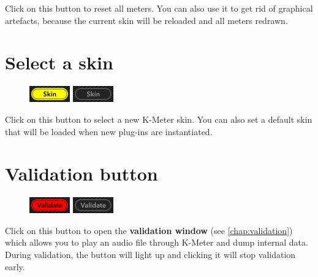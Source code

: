 Click on this button to reset all meters.  You can also use it to get
rid of graphical artefacts, because the current skin will be reloaded
and all meters redrawn.

\section{Select a skin}

\begin{figure}
\includegraphics[scale=\screenshotscale,clip]{include/images/button_skin_on.png}
\newline \vspace{-0.9\baselineskip}
\includegraphics[scale=\screenshotscale,clip]{include/images/button_skin_off.png}
\end{figure}

Click on this button to select a new K-Meter skin.  You can also set a
default skin that will be loaded when new plug-ins are instantiated.

\newpage %

\section{Validation button}
\label{sec:validation_button}

\begin{figure}
\includegraphics[scale=\screenshotscale,clip]{include/images/button_validate_on.png}
\newline \vspace{-0.9\baselineskip}
\includegraphics[scale=\screenshotscale,clip]{include/images/button_validate_off.png}
\end{figure}

Click on this button to open the \textbf{validation window} (see
\ref{chap:validation}) which allows you to play an audio file through
K-Meter and dump internal data.  During validation, the button will
light up and clicking it will stop validation early.

